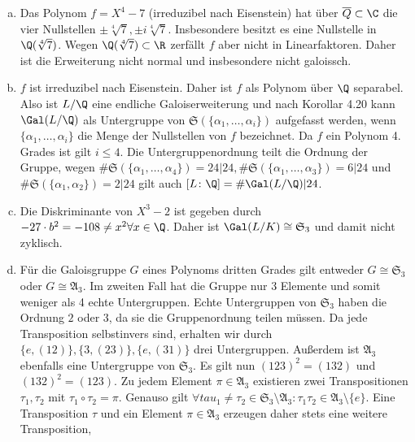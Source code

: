 \documentclass{article}
\begin{document}
    \begin{enumerate}[(a)]
        \item Das Polynom $f = X^4 -7$ (irreduzibel nach Eisenstein) hat über $\overline{Q} \subset \C$ die vier 
        Nullstellen $\pm \sqrt[4]{7}, \pm i \sqrt[4]{7}$.
        Insbesondere besitzt es eine Nullstelle in $\Q(\sqrt[4]{7})$. 
        Wegen $\Q(\sqrt[4]{7}) \subset \R$ zerfällt $f$ aber nicht in Linearfaktoren. 
        Daher ist die Erweiterung nicht normal und insbesondere nicht galoissch.
        \item $f$ ist irreduzibel nach Eisenstein. Daher ist $f$ als Polynom über $\Q$ separabel. 
        Also ist $L/\Q$ eine endliche Galoiserweiterung und nach Korollar 4.20 kann
        $\Gal(L/\Q)$ als Untergruppe von $\mathfrak{S}(\{\alpha_1, \dots, \alpha_i\})$ aufgefasst werden, 
        wenn $\{\alpha_1,\dots, \alpha_i\}$ die Menge der Nullstellen von $f$ bezeichnet.
        Da $f$ ein Polynom 4. Grades ist gilt $i \leq 4$.
        Die Untergruppenordnung teilt die Ordnung der Gruppe, wegen 
        $\# \mathfrak{S}(\{\alpha_1, \dots, \alpha_4\}) = 24 | 24, \# \mathfrak{S}(\{\alpha_1, \dots, \alpha_3\}) = 6 | 24$ und 
        $\# \mathfrak{S}(\{\alpha_1, \alpha_2\}) = 2 | 24$ gilt auch $[L\colon \Q] = \# \Gal(L/\Q) | 24$.
        \item Die Diskriminante von $X^3 - 2$ ist gegeben durch $-27 \cdot b^2 = -108 \neq x^2 \forall x \in \Q$.
        Daher ist $\Gal(L/K) \cong \mathfrak{S}_3$ und damit nicht zyklisch.
        \item Für die Galoisgruppe $G$ eines Polynoms dritten Grades gilt entweder $G\cong \mathfrak{S}_3$ oder $G \cong \mathfrak{A}_3$.
        Im zweiten Fall hat die Gruppe nur $3$ Elemente und somit weniger als 4 echte Untergruppen.
        Echte Untergruppen von $\mathfrak{S}_3$ haben die Ordnung $2$ oder $3$, da sie die Gruppenordnung teilen müssen.
        Da jede Transposition selbstinvers sind, erhalten wir durch $\{e, (12)\}, \{3, (23)\}, \{e, (31)\}$ drei Untergruppen.
        Außerdem ist $\mathfrak{A}_3$ ebenfalls eine Untergruppe von $\mathfrak{S}_3$.
        Es gilt nun $(123)^2 = (132)$ und $(132)^2 = (123)$.
        Zu jedem Element $\pi \in \mathfrak{A}_3$ existieren zwei Transpositionen $\tau_1, \tau_2$ mit $\tau_1 \circ \tau_2 = \pi$.
        Genauso gilt $\forall tau_1 \neq \tau_2 \in \mathfrak{S}_3 \setminus \mathfrak{A}_3 \colon \tau_1 \tau_2 \in \mathfrak{A}_3 \setminus \{e\}$.
        Eine Transposition $\tau$ und ein Element $\pi \in \mathfrak{A}_3$ erzeugen daher stets eine weitere Transposition, 

\end{enumerate}
\end{document}
